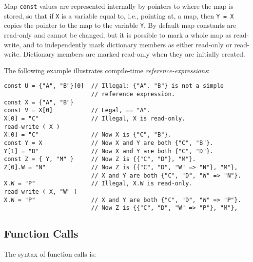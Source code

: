 \documentclass[12pt]{article}
\newenvironment{indpar}[1][0.3in]%
	{\begin{list}{}%
		     {\setlength{\itemsep}{0in}%
		      \setlength{\topsep}{0in}%
		      \setlength{\parsep}{1ex}%
		      \setlength{\labelwidth}{#1}%
		      \setlength{\leftmargin}{#1}%
		      \addtolength{\leftmargin}{\labelsep}}%
	 \item}%
	{\end{list}}
\begin{document}
Map {\tt const} values are represented internally by pointers to where
the map is stored, so that if {\tt X} is a variable equal to,
i.e., pointing at, a map, then {\tt Y = X} copies the pointer
to the map to the variable {\tt Y}.  By default map constants
are read-only and cannot be changed, but it is possible to mark
a whole map as read-write, and to independently mark dictionary members
as either read-only or read-write.
Dictionary members are marked read-only when they are initially created.

The following example illustrates compile-time {\em reference-expressions}:
\begin{indpar}\begin{verbatim}
const U = {"A", "B"}[0]  // Illegal: {"A". "B"} is not a simple
                         // reference expression.
const X = {"A", "B"}
const V = X[0]           // Legal, == "A".
X[0] = "C"               // Illegal, X is read-only.
read-write ( X )
X[0] = "C"               // Now X is {"C", "B"}.
const Y = X              // Now X and Y are both {"C", "B"}.
Y[1] = "D"               // Now X and Y are both {"C", "D"}.
const Z = { Y, "M" }     // Now Z is {{"C", "D"}, "M"}.
Z[0].W = "N"             // Now Z is {{"C", "D", "W" => "N"}, "M"},
                         // X and Y are both {"C", "D", "W" => "N"}.
X.W = "P"                // Illegal, X.W is read-only.
read-write ( X, "W" )
X.W = "P"                // X and Y are both {"C", "D", "W" => "P"}.
                         // Now Z is {{"C", "D", "W" => "P"}, "M"},
\end{verbatim}\end{indpar}

\subsection{Function Calls}
\label{FUNCTION-CALLS}

The syntax of function calls is:
\end{document}
